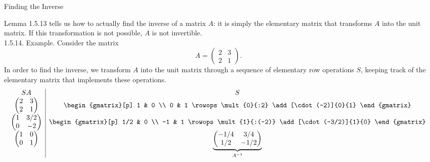 \documentclass[smaller,hyperref={CJKbookmarks=true}]{beamer}
\begin{document}
\begin{frame}{Finding the Inverse}
\begin{spacing}{1.1}
Lemma 1.5.13 tells us how to actually find the inverse of a matrix $A$: it is
simply the elementary matrix that transforms $A$ into the unit matrix. If
this transformation is not possible, $A$ is not invertible.\\[7pt]
\alert{1.5.14. Example.} Consider the matrix
\[A=\begin{pmatrix}
      2 & 3 \\
      2 & 1
    \end{pmatrix}.\]
In order to find the inverse, we transform $A$ into the unit matrix through a sequence of elementary row operations $S$, keeping track of the elementary matrix that implements these operations.
\newpage
\begin{equation*}
\begin{array}{c|c}
  SA & S \\
  \begin{pmatrix}
    2 & 3 \\
    2 & 1
  \end{pmatrix} & \begin{gmatrix}[p]
                    1 & 0 \\
                    0 & 1
                    \rowops
                    \mult{0}{:2}
                    \add[\cdot(-2)]{0}{1}
                  \end{gmatrix} \\
  \begin{pmatrix}
    1 & 3/2 \\
    0 & -2
  \end{pmatrix} & \begin{gmatrix}[p]
                    1/2 & 0 \\
                    -1 & 1
                    \rowops
                    \mult{1}{:(-2)}
                    \add[\cdot(-3/2)]{1}{0}
                  \end{gmatrix} \\
  \begin{pmatrix}
    1 & 0 \\
    0 & 1
  \end{pmatrix} & \underbrace{\begin{pmatrix}
                                -1/4 & 3/4 \\
                                1/2 & -1/2
                              \end{pmatrix}}_{A^{-1}}

\end{array}
\end{equation*}
\end{spacing}
\end{frame}
\end{document}
